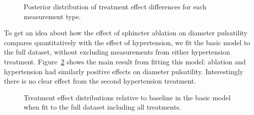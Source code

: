 \documentclass[
  letterpaper,
  DIV=11,
  numbers=noendperiod,
  oneside]{scrartcl}
\theoremstyle{plain}
\theoremstyle{remark}
\begin{document}
\begin{figure}


\caption{\label{fig-pulsatility-treatment-effects}Posterior distribution
of treatment effect differences for each measurement type.}

\end{figure}%

To get an idea about how the effect of sphincter ablation on diameter
pulsatility compares quantitatively with the effect of hypertension, we
fit the basic model to the full dataset, without excluding measurements
from either hypertension treatment.
Figure~\ref{fig-pulsatility-treatment-effects-full} shows the main
result from fitting this model: ablation and hypertension had similarly
positive effects on diameter pulsatility. Interestingly there is no
clear effect from the second hypertension treatment.

\begin{figure}


\caption{\label{fig-pulsatility-treatment-effects-full}Treatment effect
distributions relative to baseline in the basic model when fit to the
full dataset including all treatments.}

\end{figure}%
\end{document}
